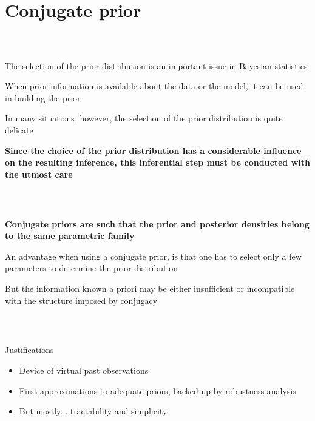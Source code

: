 \documentclass[notes,professionalfont,11pt,usenames,dvipsnames]{beamer}
\newcommand\justify{\rightskip0pt \leftskip0pt}
\newenvironment{slide}
{\begin{frame}[environment=slide]
\frametitle{\insertsection \\ \insertsubsection}\justify\setlength{\parskip}{0.5cm}\vspace{-1cm}}
{\end{frame}}
\begin{document}
\section{Conjugate prior}

\begin{slide}

The selection of the prior distribution is an important issue in
Bayesian statistics


When prior information is available about the
data or the model, it can be used in building the prior 


In many situations, however, the selection of the prior distribution is quite delicate


{\bf \color{red} Since the choice of the prior distribution has a considerable influence on
the resulting inference, this inferential step must be conducted with the utmost care}

\end{slide}

\begin{slide}

{\bf Conjugate priors are such that the prior and posterior densities belong to the same parametric family}


An advantage when using a conjugate prior, is that one has to select only
a few parameters to determine the prior distribution 


But the information known a priori may be either insufficient or 
incompatible with the structure imposed by conjugacy

\end{slide}

\begin{slide}
\begin{minipage}{\linewidth}

Justifications
\begin{itemize}
\item Device of virtual past observations
\item First approximations to adequate priors, backed up by robustness
analysis
\item But mostly... tractability and simplicity
\end{itemize}

\end{minipage}
\end{slide}
\end{document}

